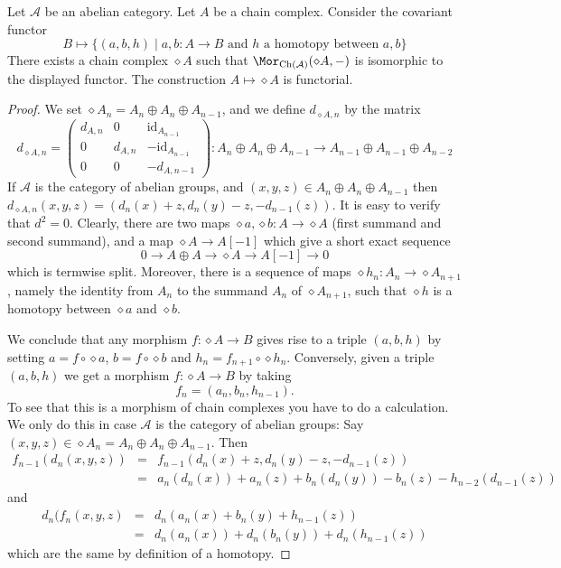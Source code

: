 \begin{lemma}
\label{lemma-represent-homotopy}
Let $\mathcal{A}$ be an abelian category. Let $A$ be a chain complex.
Consider the covariant functor
$$
B \longmapsto
\{
(a, b, h)
\mid
a, b : A \to B\text{ and }h\text{ a homotopy between }a, b
\}
$$
There exists a chain complex $\diamond A$
such that $\Mor_{\text{Ch}(\mathcal{A})}(\diamond A, -)$
is isomorphic to the displayed functor.
The construction $A \mapsto \diamond A$ is functorial.
\end{lemma}

\begin{proof}
We set $\diamond A_n = A_n \oplus A_n \oplus A_{n - 1}$,
and we define $d_{\diamond A, n}$ by the matrix
$$
d_{\diamond A, n}
=
\left(
\begin{matrix}
d_{A, n} & 0 & \text{id}_{A_{n - 1}} \\
0 & d_{A, n} & -\text{id}_{A_{n - 1}} \\
0 & 0 & -d_{A, n - 1}
\end{matrix}
\right) :
A_n \oplus A_n \oplus A_{n - 1} \to
A_{n - 1} \oplus A_{n - 1} \oplus A_{n - 2}
$$
If $\mathcal{A}$ is the category of abelian groups,
and $(x, y, z) \in A_n \oplus A_n \oplus A_{n - 1}$
then $d_{\diamond A, n}(x, y, z) = (d_n(x) + z, d_n(y) - z, -d_{n - 1}(z))$.
It is easy to verify that $d^2 = 0$. Clearly,
there are two maps $\diamond a, \diamond b : A \to \diamond A$
(first summand and second summand),
and a map $\diamond A \to A[-1]$ which give
a short exact sequence
$$
0 \to
A \oplus A \to
\diamond A \to
A[-1] \to
0
$$
which is termwise split. Moreover, there is a sequence
of maps $\diamond h_n : A_n \to \diamond A_{n + 1}$, namely
the identity from $A_n$ to the summand $A_n$ of $\diamond A_{n + 1}$,
such that $\diamond h$ is a homotopy between $\diamond a$ and $\diamond b$.

\medskip\noindent
We conclude that any morphism $f : \diamond A \to B$
gives rise to a triple $(a, b, h)$ by setting $a = f \circ \diamond a$,
$b = f \circ \diamond b$ and $h_n = f_{n + 1} \circ \diamond h_n$.
Conversely, given a triple $(a, b, h)$ we get a morphism
$f : \diamond A \to B$ by taking
$$
f_n = (a_n, b_n, h_{n - 1}).
$$
To see that this is a morphism of chain complexes you have
to do a calculation. We only do this in case $\mathcal{A}$
is the category of abelian groups:
Say $(x, y, z) \in \diamond A_n = A_n \oplus A_n \oplus A_{n - 1}$.
Then
\begin{eqnarray*}
f_{n - 1}(d_n(x, y, z)) & = &
f_{n - 1}(d_n(x) + z, d_n(y) - z, -d_{n - 1}(z)) \\
& = &
a_n(d_n(x)) + a_n(z) + b_n(d_n(y)) - b_n(z) - h_{n - 2}(d_{n - 1}(z))
\end{eqnarray*}
and
\begin{eqnarray*}
d_n(f_n(x, y, z) & = &
d_n(a_n(x) + b_n(y) + h_{n - 1}(z)) \\
& = &
d_n(a_n(x)) + d_n(b_n(y)) + d_n(h_{n - 1}(z))
\end{eqnarray*}
which are the same by definition of a homotopy.
\end{proof}
